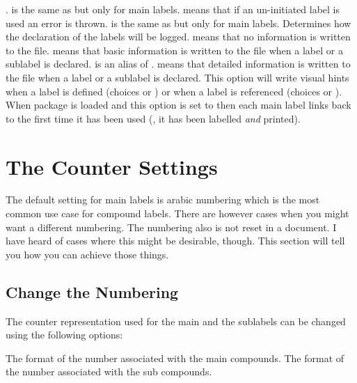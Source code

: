 \documentclass[load-preamble+,ngerman,british,american]{cnltx-doc}
\begin{document}
\begin{options}
    .   is the same as  but only for main
    labels.   means that if an un-initiated label is used an
    error is thrown.   is the same as  but only
    for main labels.
    Determines how the declaration of the labels will be logged.  
    means that no information is written to the  file.  
    means that basic information is written to the  file when a
    label or a sublabel is declared.   is an alias of
    .   means that detailed information is written to
    the  file when a label or a sublabel is declared.
    This option will write visual hints when a label is defined (choices
     or ) or when a label is referenced (choices
     or ).
    When package  is loaded and this option is
    set to  then each main label links back to the first time it
    has been used (\ie, it has been labelled \emph{and} printed).
\end{options}

\section{The Counter Settings}\label{sec:counter-settings}
The default setting for main labels is arabic numbering which is the most
common use case for compound labels.  There are however cases when you might
want a different numbering.  The numbering also is not reset in a document.  I
have heard of cases where this might be desirable, though.  This section will
tell you how you can achieve those things.

\subsection{Change the Numbering}\label{sec:change-numbering}

The counter representation used for the main and the sublabels can be changed
using the following options:
\begin{options}
    The format of the number associated with the main compounds.
    The format of the number associated with the sub compounds.  
\end{options}
\end{document}
